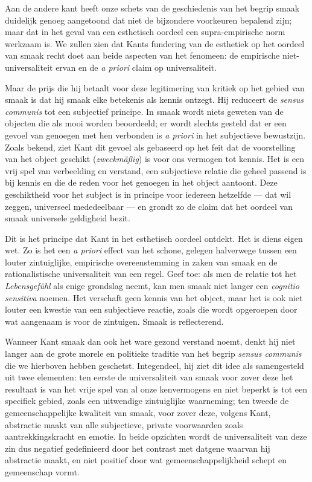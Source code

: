 Aan de andere kant heeft onze schets van de geschiedenis van het begrip smaak duidelijk genoeg aangetoond dat niet de bijzondere voorkeuren bepalend zijn; maar dat in het geval van een esthetisch oordeel een supra-empirische norm werkzaam is. We zullen zien dat Kants fundering van de esthetiek op het oordeel van smaak recht doet aan beide aspecten van het fenomeen: de empirische niet-universaliteit ervan en de \textit{a priori} claim op universaliteit.

Maar de prijs die hij betaalt voor deze legitimering van kritiek op het gebied van smaak is dat hij smaak elke betekenis als kennis ontzegt. Hij reduceert de \textit{sensus communis} tot een subjectief principe. In smaak wordt niets geweten van de objecten die als mooi worden beoordeeld; er wordt slechts gesteld dat er een gevoel van genoegen met hen verbonden is \textit{a priori} in het subjectieve bewustzijn. Zoals bekend, ziet Kant dit gevoel als gebaseerd op het feit dat de voorstelling van het object geschikt (\textit{zweckmäßig}) is voor ons vermogen tot kennis. Het is een vrij spel van verbeelding en verstand, een subjectieve relatie die geheel passend is bij kennis en die de reden voor het genoegen in het object aantoont. Deze geschiktheid voor het subject is in principe voor iedereen hetzelfde — dat wil zeggen, universeel mededeelbaar — en grondt zo de claim dat het oordeel van smaak universele geldigheid bezit.

Dit is het principe dat Kant in het esthetisch oordeel ontdekt. Het is diens eigen wet. Zo is het een \textit{a priori} effect van het schone, gelegen halverwege tussen een louter zintuiglijke, empirische overeenstemming in zaken van smaak en de rationalistische universaliteit van een regel. Geef toe: als men de relatie tot het \textit{Lebensgefühl} als enige grondslag neemt, kan men smaak niet langer een \textit{cognitio sensitiva} noemen. Het verschaft geen kennis van het object, maar het is ook niet louter een kwestie van een subjectieve reactie, zoals die wordt opgeroepen door wat aangenaam is voor de zintuigen. Smaak is reflecterend.

Wanneer Kant smaak dan ook het ware gezond verstand noemt, denkt hij niet langer aan de grote morele en politieke traditie van het begrip \textit{sensus communis} die we hierboven hebben geschetst. Integendeel, hij ziet dit idee als samengesteld uit twee elementen: ten eerste de universaliteit van smaak voor zover deze het resultaat is van het vrije spel van al onze kenvermogens en niet beperkt is tot een specifiek gebied, zoals een uitwendige zintuiglijke waarneming; ten tweede de gemeenschappelijke kwaliteit van smaak, voor zover deze, volgens Kant, abstractie maakt van alle subjectieve, private voorwaarden zoals aantrekkingskracht en emotie. In beide opzichten wordt de universaliteit van deze zin dus negatief gedefinieerd door het contrast met datgene waarvan hij abstractie maakt, en niet positief door wat gemeenschappelijkheid schept en gemeenschap vormt.

